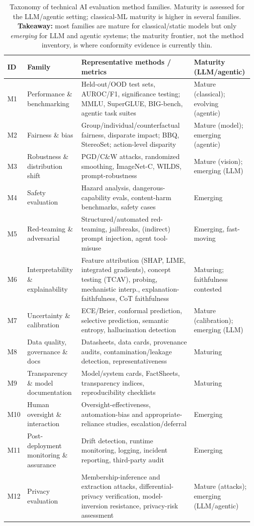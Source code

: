 \begin{table}[!tp]
\centering
\caption{Taxonomy of technical AI evaluation method families. Maturity is assessed for the
LLM/agentic setting; classical-ML maturity is higher in several families. \textbf{Takeaway:}
most families are mature for classical/static models but only \emph{emerging} for LLM and
agentic systems; the maturity frontier, not the method inventory, is where conformity evidence
is currently thin.}
\label{tab:taxonomy}
\footnotesize
\begin{tabular}{p{}p{}p{}p{}}
\toprule
ID & Family & Representative methods / metrics & Maturity (LLM/agentic)\\
\midrule
M1 & Performance \& benchmarking & Held-out/OOD test sets, AUROC/F1, significance testing; MMLU, SuperGLUE, BIG-bench, agentic task suites & Mature (classical); evolving (agentic)\\
M2 & Fairness \& bias & Group/individual/counterfactual fairness, disparate impact; BBQ, StereoSet; action-level disparity & Mature (model); emerging (agentic)\\
M3 & Robustness \& distribution shift & PGD/C\&W attacks, randomized smoothing, ImageNet-C, WILDS, prompt-robustness & Mature (vision); emerging (LLM)\\
M4 & Safety evaluation & Hazard analysis, dangerous-capability evals, content-harm benchmarks, safety cases & Emerging\\
M5 & Red-teaming \& adversarial & Structured/automated red-teaming, jailbreaks, (indirect) prompt injection, agent tool-misuse & Emerging, fast-moving\\
M6 & Interpretability \& explainability & Feature attribution (SHAP, LIME, integrated gradients), concept testing (TCAV), probing, mechanistic interp., explanation-faithfulness, CoT faithfulness & Maturing; faithfulness contested\\
M7 & Uncertainty \& calibration & ECE/Brier, conformal prediction, selective prediction, semantic entropy, hallucination detection & Mature (calibration); emerging (LLM)\\
M8 & Data quality, governance \& docs & Datasheets, data cards, provenance audits, contamination/leakage detection, representativeness & Maturing\\
M9 & Transparency \& model documentation & Model/system cards, FactSheets, transparency indices, reproducibility checklists & Maturing\\
M10 & Human oversight \& interaction & Oversight-effectiveness, automation-bias and appropriate-reliance studies, escalation/deferral & Emerging\\
M11 & Post-deployment monitoring \& assurance & Drift detection, runtime monitoring, logging, incident reporting, third-party audit & Emerging\\
M12 & Privacy evaluation & Membership-inference and extraction attacks, differential-privacy verification, model-inversion resistance, privacy-risk assessment & Mature (attacks); emerging (LLM/agentic)\\
\bottomrule
\end{tabular}
\end{table}
